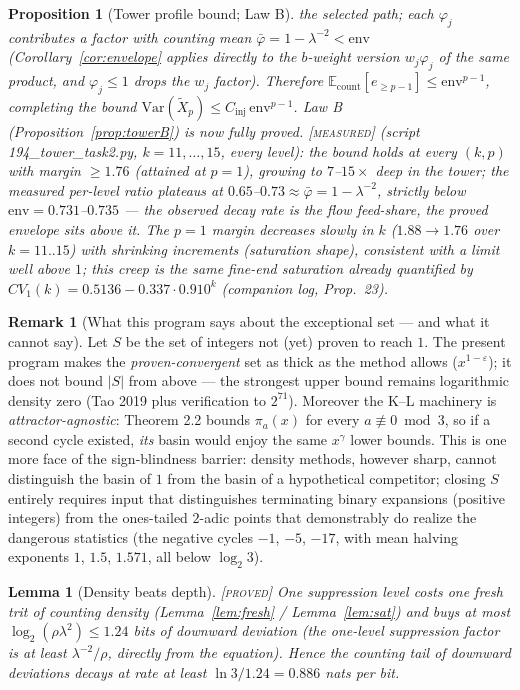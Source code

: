 \documentclass[11pt]{article}
\newtheorem{lemma}[theorem]{Lemma}
\newtheorem{proposition}[theorem]{Proposition}
\theoremstyle{definition}
\newtheorem{remark}[theorem]{Remark}
\newcommand{\PROVED}{\textup{[\textsc{proved}]}}
\newcommand{\MEASURED}{\textup{[\textsc{measured}]}}
\newcommand{\E}{\mathbb{E}}
\newcommand{\Var}{\mathrm{Var}}
\newcommand{\lam}{\lambda}
\newcommand{\pbar}{\bar\varphi}
\begin{document}
\begin{proposition}[Tower profile bound; Law B]
the selected path; each $\varphi_j$ contributes a factor with
counting mean $\pbar = 1 - \lam^{-2} < \mathrm{env}$
(Corollary~\ref{cor:envelope} applies directly to the $b$-weight
version $w_j \varphi_j$ of the same product, and $\varphi_j \le 1$
drops the $w_j$ factor). Therefore
$\E_{\mathrm{count}}[e_{\ge p-1}] \le \mathrm{env}^{p-1}$,
completing the bound $\Var(\tilde X_p) \le C_{\mathrm{inj}}\,\mathrm{env}^{p-1}$.
\emph{Law B (Proposition~\ref{prop:towerB}) is now fully proved.}
\MEASURED{} (script 194\_tower\_task2.py, $k = 11,\dots,15$, every level):
the bound holds at \emph{every} $(k,p)$ with margin $\ge 1.76$ (attained
at $p=1$), growing to $7$--$15\times$ deep in the tower; the measured
per-level ratio plateaus at $0.65$--$0.73 \approx \pbar = 1 - \lam^{-2}$,
strictly below $\mathrm{env} = 0.731$--$0.735$ --- the observed decay rate
is the flow feed-share, the proved envelope sits above it. The $p=1$
margin decreases slowly in $k$ ($1.88 \to 1.76$ over $k=11..15$) with
shrinking increments (saturation shape), consistent with a limit well
above $1$; this creep is the same fine-end saturation already quantified
by $CV_1(k) = 0.5136 - 0.337\cdot 0.910^k$ (companion log, Prop.\ 23).
\end{proposition}

\begin{remark}[What this program says about the exceptional set --- and what
it cannot say]\label{rem:S}
Let $S$ be the set of integers not (yet) proven to reach $1$. The present
program makes the \emph{proven-convergent} set as thick as the method
allows ($x^{1-\varepsilon}$); it does not bound $|S|$ from above --- the
strongest upper bound remains logarithmic density zero (Tao 2019 plus
verification to $2^{71}$). Moreover the K--L machinery is
\emph{attractor-agnostic}: Theorem 2.2 bounds $\pi_a(x)$ for every
$a \not\equiv 0 \bmod 3$, so if a second cycle existed, \emph{its} basin
would enjoy the same $x^{\gamma}$ lower bounds. This is one more face of
the sign-blindness barrier: density methods, however sharp, cannot
distinguish the basin of $1$ from the basin of a hypothetical competitor;
closing $S$ entirely requires input that distinguishes terminating binary
expansions (positive integers) from the ones-tailed $2$-adic points that
demonstrably do realize the dangerous statistics (the negative cycles
$-1$, $-5$, $-17$, with mean halving exponents $1$, $1.5$, $1.571$, all
below $\log_2 3$).
\end{remark}

\begin{lemma}[Density beats depth]\label{lem:depth} \PROVED{}
One suppression level costs one fresh trit of counting density
(Lemma~\ref{lem:fresh} / Lemma~\ref{lem:sat}) and buys at most
$\log_2(\rho\lam^2) \le 1.24$ bits of downward deviation (the one-level
suppression factor is at least $\lam^{-2}/\rho$, directly from the equation).
Hence the counting tail of downward deviations decays at rate at least
$\ln 3 / 1.24 = 0.886$ nats per bit.
\end{lemma}
\end{document}
